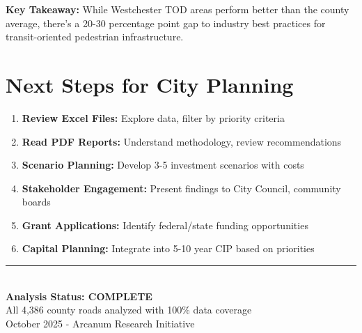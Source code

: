 \documentclass[11pt,letterpaper]{article}
\begin{document}
\textbf{Key Takeaway:} While Westchester TOD areas perform better than the county average, there's a 20-30 percentage point gap to industry best practices for transit-oriented pedestrian infrastructure.

\vspace{1em}

\section{Next Steps for City Planning}

\begin{enumerate}[leftmargin=*]
    \item \textbf{Review Excel Files:} Explore data, filter by priority criteria
    \item \textbf{Read PDF Reports:} Understand methodology, review recommendations
    \item \textbf{Scenario Planning:} Develop 3-5 investment scenarios with costs
    \item \textbf{Stakeholder Engagement:} Present findings to City Council, community boards
    \item \textbf{Grant Applications:} Identify federal/state funding opportunities
    \item \textbf{Capital Planning:} Integrate into 5-10 year CIP based on priorities
\end{enumerate}

\vspace{2em}

\begin{center}
\rule{0.8\textwidth}{0.4pt}\\
\textbf{Analysis Status: COMPLETE}\\
All 4,386 county roads analyzed with 100\% data coverage\\
October 2025 - Arcanum Research Initiative
\end{center}
\end{document}
